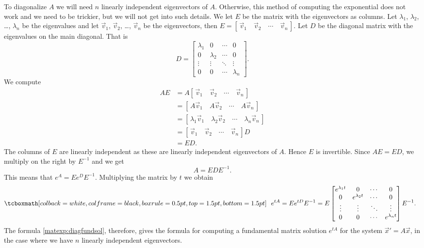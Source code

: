 To diagonalize $A$
we will need $n$ linearly independent eigenvectors of $A$.
Otherwise, this method of computing the exponential does not work and we need to be trickier, but we will
not get into such details.
We let $E$ be the matrix with the eigenvectors as columns.  
Let $\lambda_1$, $\lambda_2$, \ldots, $\lambda_n$ be the eigenvalues and
let $\vec{v}_1$, $\vec{v}_2$, \ldots, $\vec{v}_n$ be the eigenvectors, then
$E = [\, \vec{v}_1 \quad \vec{v}_2 \quad \cdots \quad \vec{v}_n \,]$.
Let $D$ be the diagonal matrix with the eigenvalues on the main diagonal.
That is
\begin{equation*}
D =
\begin{bmatrix}
\lambda_1 & 0 & \cdots & 0 \\
0 & \lambda_2 & \cdots & 0 \\
\vdots & \vdots & \ddots & \vdots \\
0 & 0 & \cdots & \lambda_n
\end{bmatrix} .
\end{equation*}
We compute
\begin{equation*}
\begin{split}
AE & = A 
[\, \vec{v}_1 \quad \vec{v}_2 \quad \cdots \quad \vec{v}_n \,]
\\
& =
[\, A\vec{v}_1 \quad A\vec{v}_2 \quad \cdots \quad A\vec{v}_n \,]
\\
& =
[\, \lambda_1 \vec{v}_1 \quad \lambda_2 \vec{v}_2 \quad \cdots \quad
\lambda_n \vec{v}_n \,]
\\
& =
[\, \vec{v}_1 \quad \vec{v}_2 \quad \cdots \quad \vec{v}_n \,] D
\\
& =
ED .
\end{split}
\end{equation*}
The columns of $E$ are linearly independent as these are
linearly independent eigenvectors of
$A$.  Hence $E$ is invertible.
Since $AE = ED$, we multiply on the right by $E^{-1}$ and we get
\begin{equation*}
A = E D E^{-1}.
\end{equation*}
This means that $e^A = E e^D E^{-1}$.  Multiplying the matrix by $t$ we obtain
\begin{equation} \label{matexp:diagfundsol}
\mybxbg{~~
e^{tA} = 
Ee^{tD}E^{-1} = 
E
\begin{bmatrix}
e^{\lambda_1 t} & 0 & \cdots & 0 \\
0 & e^{\lambda_2 t} & \cdots & 0 \\
\vdots & \vdots & \ddots & \vdots \\
0 & 0 & \cdots & e^{\lambda_n t}
\end{bmatrix} 
E^{-1} .
~~}
\end{equation}
The formula \eqref{matexp:diagfundsol}, therefore, gives the formula
for computing a fundamental matrix solution $e^{tA}$ for the
system ${\vec{x}}' = A \vec{x}$, in the case where we have
$n$ linearly independent eigenvectors.

